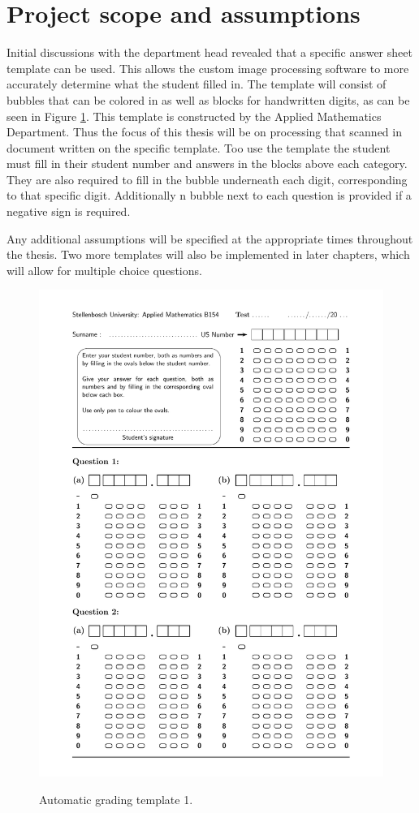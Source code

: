 \section{Project scope and assumptions}\label{sec:Scope}
Initial discussions with the department head revealed that a specific answer sheet template can be used. This allows the custom image processing software to more accurately determine what the student filled in. The template will consist of bubbles that can be colored in as well as blocks for handwritten digits, as can be seen in Figure \ref{fig:NumbersTemplate}. This template is constructed by the Applied Mathematics Department. Thus the focus of this thesis will be on processing that scanned in document written on the specific template. Too use the template the student must fill in their student number and answers in the blocks above each category. They are also required to fill in the bubble underneath each digit, corresponding to that specific digit. Additionally n bubble next to each question is provided if a negative sign is required.

Any additional assumptions will be specified at the appropriate times throughout the thesis. Two more templates will also be implemented in later chapters, which will allow for multiple choice questions.

\begin{figure}
  \centering
  \includegraphics[width=14cm]{NumbersTemplate}\\
  \caption{Automatic grading template 1.}
  \label{fig:NumbersTemplate}
\end{figure}

